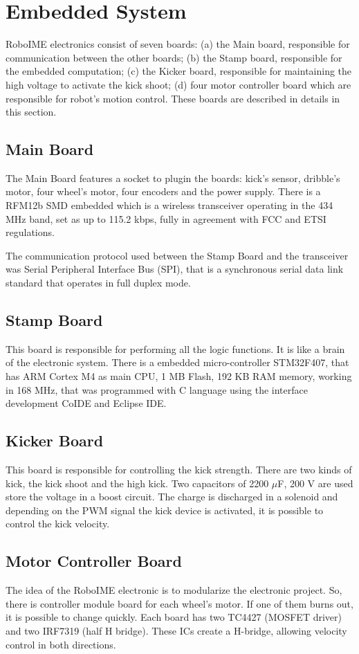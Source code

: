 \section{Embedded System}
RoboIME electronics consist of seven boards: (a) the Main board, responsible for communication between the other boards; (b) the Stamp board,
responsible  for the embedded computation; (c) the Kicker board, responsible for maintaining the high voltage to activate the kick shoot;
(d) four motor controller board which are responsible for robot's motion control. These boards are described in details in this section.

\subsection{Main Board}
The Main Board features a socket to plugin the boards: kick's sensor, dribble's motor, four wheel's motor, four encoders and the power supply.
There is a RFM12b SMD embedded which is a wireless transceiver operating in the 434 MHz band, set as up to 115.2 kbps, fully in agreement
with FCC and ETSI regulations.

The communication protocol used between the Stamp Board and the transceiver was Serial Peripheral Interface Bus (SPI), that  is a synchronous
serial data link standard that operates in full duplex mode.

\subsection{Stamp Board}
This board is responsible  for performing all the logic functions. It is like a brain of the electronic system. There is a embedded micro-controller STM32F407,
that has ARM Cortex M4 as main CPU, 1 MB Flash, 192 KB RAM memory, working in 168 MHz, that was programmed with C language using the  interface development
CoIDE and Eclipse IDE.

\subsection{Kicker Board}
This board is responsible for controlling the kick strength. There are two kinds of kick,
the kick shoot and the high kick. Two capacitors of 2200 $\mu$F, 200 V are used store the
voltage in a boost circuit. The charge is discharged in a solenoid and depending on the PWM
signal the kick device is activated, it is possible to control the kick velocity.


\subsection{Motor Controller Board}
The idea of the RoboIME electronic is to modularize the electronic project. So, there
is controller module board for each wheel's motor. If one of them burns out, it is
possible to change quickly. Each board has two TC4427 (MOSFET driver) and two
IRF7319 (half H bridge). These ICs create a H-bridge, allowing velocity control in
both directions.
